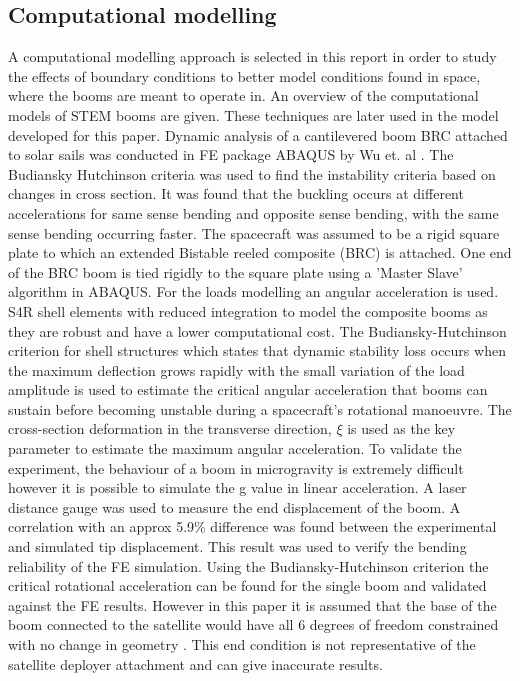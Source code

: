 \subsection{Computational modelling}
A computational modelling approach is selected in this report in order to study the effects of boundary conditions to better model conditions found in space, where the booms are meant to operate in. An overview of the computational models of STEM booms are given. These techniques are later used in the model developed for this paper. 
Dynamic analysis of a cantilevered boom BRC attached to solar sails was conducted in FE package ABAQUS by Wu et. al \cite{Wu2018}. The Budiansky Hutchinson criteria\cite{Budiansky} was used to find the instability criteria based on changes in cross section. It was found that the buckling occurs at different accelerations for same sense bending and opposite sense bending, with the same sense bending occurring faster. The spacecraft was assumed to be a rigid square plate to which an extended Bistable reeled composite (BRC) is attached. 
One end of the BRC boom is tied rigidly to the square plate using a 'Master Slave' algorithm in ABAQUS. For the loads modelling an angular acceleration is used. S4R shell elements with reduced integration to model the composite booms as they are robust and have a lower computational cost. 
The Budiansky-Hutchinson criterion \cite{Budiansky} for shell structures which states that dynamic stability loss occurs when the maximum deflection grows rapidly with the small variation of the load amplitude is used to estimate the critical angular acceleration that booms can sustain before becoming unstable during a spacecraft's rotational manoeuvre. 
The cross-section deformation in the transverse direction, $\xi$ is used as the key parameter to estimate the maximum angular acceleration. To validate the experiment, the behaviour of a boom in microgravity is extremely difficult however it is possible to simulate the g value in linear acceleration.
A laser distance gauge was used to measure the end displacement of the boom. A correlation with an approx 5.9\% difference was found between the experimental and simulated tip displacement. 
This result was used to verify the bending reliability of the FE simulation. Using the Budiansky-Hutchinson criterion the critical rotational acceleration can be found for the single boom and validated against the FE results. However in this paper it is assumed that the base of the boom connected to the satellite would have all 6 degrees of freedom constrained with no change in geometry \cite{Wu2016}. This end condition is not representative of the satellite deployer attachment and can give inaccurate results.
